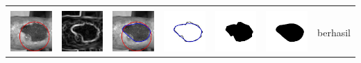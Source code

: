 \begin{table}[H]
\begin{tabular}{|m{0.7in}|m{0.7in}|m{0.7in}|m{0.7in}|m{0.7in}|m{0.7in}|m{0.7in}|}
		&  &  & & & &  \\
		\includegraphics[width=0.7in]{dataset/dataset_3/luka_merah/ready/33_interp_init.jpg}&
		\includegraphics[width=0.7in]{dataset/dataset_3/luka_merah/ready/33_interp_ext.jpg}&
		\includegraphics[width=0.7in]{dataset/dataset_3/luka_merah/ready/33_interp_result.jpg}&
		\includegraphics[width=0.7in]{dataset/dataset_3/luka_merah/ready/33_gt_r.jpg}&
		\includegraphics[width=0.7in]{dataset/dataset_3/luka_merah/ready/33_r.jpg}&
		\includegraphics[width=0.7in]{dataset/dataset_3/luka_merah/ready/33_interp_r.jpg}&
		berhasil\\
		\hline
		

\end{tabular}
\end{table}

